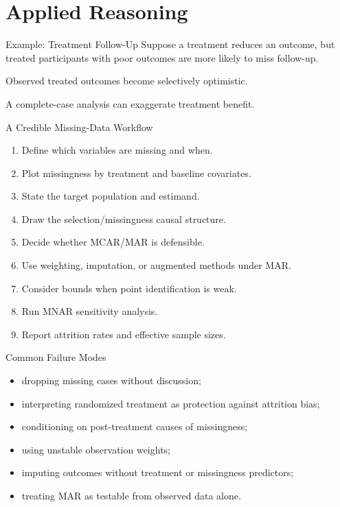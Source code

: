\documentclass[aspectratio=169,11pt]{beamer}
\begin{document}
\section{Applied Reasoning}

\begin{frame}{Example: Treatment Follow-Up}
Suppose a treatment reduces an outcome, but treated participants with poor outcomes are more likely to miss follow-up.

Observed treated outcomes become selectively optimistic.

A complete-case analysis can exaggerate treatment benefit.
\end{frame}

\begin{frame}{A Credible Missing-Data Workflow}
\begin{enumerate}
\item Define which variables are missing and when.
\item Plot missingness by treatment and baseline covariates.
\item State the target population and estimand.
\item Draw the selection/missingness causal structure.
\item Decide whether MCAR/MAR is defensible.
\item Use weighting, imputation, or augmented methods under MAR.
\item Consider bounds when point identification is weak.
\item Run MNAR sensitivity analysis.
\item Report attrition rates and effective sample sizes.
\end{enumerate}
\end{frame}

\begin{frame}{Common Failure Modes}
\begin{itemize}
\item dropping missing cases without discussion;
\item interpreting randomized treatment as protection against attrition bias;
\item conditioning on post-treatment causes of missingness;
\item using unstable observation weights;
\item imputing outcomes without treatment or missingness predictors;
\item treating MAR as testable from observed data alone.
\end{itemize}
\end{frame}
\end{document}
